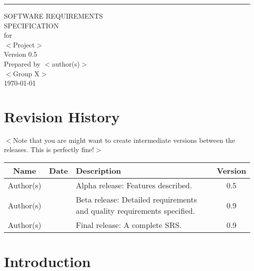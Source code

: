 \documentclass{scrreprt}
\date{}
\def\myversion{0.5 }
\begin{document}
\begin{flushright}
    \rule{16cm}{5pt}\vskip1cm
    \begin{bfseries}
        \Huge{SOFTWARE REQUIREMENTS\\ SPECIFICATION}\\
        \vspace{1.9cm}
        for\\
        \vspace{1.9cm}
        $<$Project$>$\\
        \vspace{1.9cm}
        \LARGE{Version \myversion}\\
        \vspace{1.9cm}
        Prepared by $<$author(s)$>$\\
        \vspace{1.9cm}
        $<$Group X$>$\\
        \vspace{1.9cm}
        \today\\
    \end{bfseries}
\end{flushright}

\tableofcontents


\chapter*{Revision History}
$<$Note that you are might want to create intermediate versions between the releases. This is
perfectly fine!$>$

\begin{center}
    \begin{tabular}{|c|c|p{8cm}|c|}
        \hline
	    Name & Date & Description & Version\\
        \hline
	    Author(s) &  &  Alpha release: Features described. & 0.5\\
        \hline
	    Author(s) &  & Beta release: Detailed requirements and quality requirements specified. & 0.9\\
        \hline
        Author(s) &  & Final release: A complete SRS. & 0.9\\
        \hline
    \end{tabular}
\end{center}

\chapter{Introduction}
\end{document}
